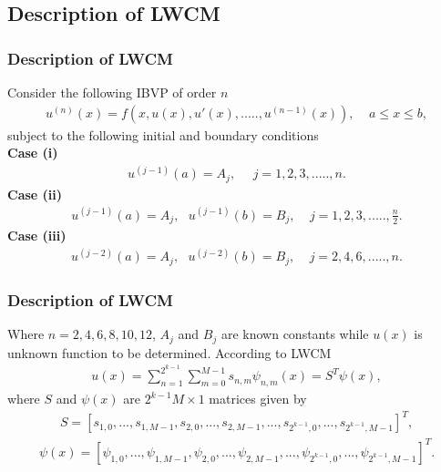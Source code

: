 \documentclass{beamer}
\begin{document}
\subsection{Description of LWCM}
\begin{frame}\frametitle{Description of LWCM}
		\justifying
	 Consider the following IBVP of order $n$
		\begin{eqnarray}\label{ch4}
			u^{(n)}(x)=f(x, u(x), u'(x), .....,u^{(n-1)}(x)),~~~~~a\leq x \leq b,
			\end{eqnarray}
			\small
			subject to the following initial and boundary conditions\\
	\textbf{Case (i)}
	\begin{eqnarray}\label{cha}
		u^{(j-1)}(a)=A_{j},~~~~~~j=1, 2, 3,.....,n.
	\end{eqnarray}
\textbf{Case (ii)}
	\begin{eqnarray}\label{chb}
		u^{(j-1)}(a)=A_{j},~~~u^{(j-1)}(b)=B_{j},~~~~~j=1, 2, 3,.....,\frac{n}{2}.
	\end{eqnarray}
\textbf{Case (iii)}
	\begin{eqnarray}\label{chc}
		u^{(j-2)}(a)=A_{j},~~~u^{(j-2)}(b)=B_{j},~~~~~j=2, 4, 6,.....,n.
	\end{eqnarray}
	 \end{frame}
	\begin{frame}\frametitle{Description of LWCM}
		\justifying
	    Where $n=2, 4, 6, 8, 10,12$, $A_{j}$ and $B_{j}$ are known constants while $u(x)$ is unknown function to be determined. According to LWCM
		\begin{eqnarray}\label{ch5}
		u(x)=\sum_{n=1}^{2^{k-1}}\sum_{m=0}^{M-1}s_{n,m}\psi_{n,m}(x)=S^{T}\psi(x),
		\end{eqnarray} 
	    where $S$ and $\psi(x)$ are $2^{k-1}M\times1$ matrices given by
		\begin{eqnarray}\label{6}
		S=[s_{1,0},...,s_{1,M-1},s_{2,0},...,s_{2,M-1},...,s_{2^{k-1},0},...,s_{2^{k-1},M-1}]^{T},\nonumber
		\end{eqnarray}
		\small
		\begin{eqnarray}\label{7}
		\psi(x)=[\psi_{1,0},...,\psi_{1,M-1},\psi_{2,0},...,\psi_{2,M-1},...,\psi_{2^{k-1},0},...,\psi_{2^{k-1},M-1}]^{T}.\nonumber
		\end{eqnarray}
		\normalsize   	
\end{frame}
\end{document}
